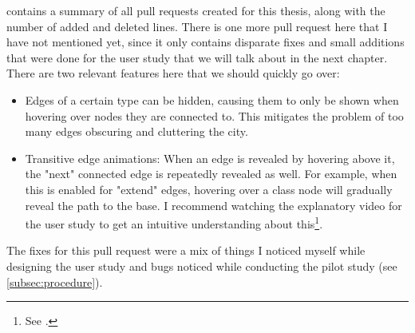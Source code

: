 \documentclass[../thesis]{subfiles}
\begin{document}
 contains a summary of all pull requests created for this thesis, along with the number of added and deleted lines.
There is one more pull request here that I have not mentioned yet, since it only contains disparate fixes and small additions that were done for the user study that we will talk about in the next chapter.
There are two relevant features here that we should quickly go over:
\begin{itemize}
	\item Edges of a certain type can be hidden, causing them to only be shown when hovering over nodes they are connected to.
	      This mitigates the problem of too many edges obscuring and cluttering the \gls{city}.
	\item Transitive edge animations:
	      When an edge is revealed by hovering above it, the "next" connected edge is repeatedly revealed as well.
	      For example, when this is enabled for "extend" edges, hovering over a class node will gradually reveal the path to the \gls{base}.
	      I recommend watching the explanatory video for the user study to get an intuitive understanding about this\footnote{
		      See .
	      }.
\end{itemize}
The fixes for this pull request were a mix of things I noticed myself while designing the user study and bugs noticed while conducting the pilot study (see \cref{subsec:procedure}).
\end{document}
